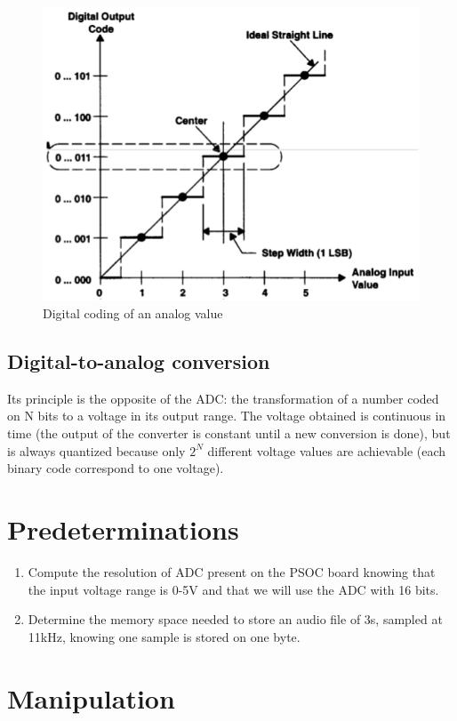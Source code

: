 \documentclass[11pt,a4paper]{article}
\theoremstyle{definition}%
\begin{document}
\begin{figure}
	\centering
	\includegraphics[width=.7\textwidth]{an-dig}
	\caption{Digital coding of an analog value}
	\label{fig:an-dig}
\end{figure}

\subsection{Digital-to-analog conversion}
Its principle is the opposite of the ADC: the transformation of a number coded on N bits to a voltage in its output range.
The voltage obtained is continuous in time (the output of the converter is constant until a new conversion is done), but is always quantized because only $2^N$ different voltage values are achievable (each binary code correspond to one voltage).



\section{Predeterminations}\label{sec:predet}
\begin{enumerate}
	\item Compute the resolution of ADC present on the PSOC board knowing that the input voltage range is 0-5V and that we will use the ADC with 16 bits.
	\item Determine the memory space needed to store an audio file of 3s, sampled at 11kHz, knowing one sample is stored on one byte.
\end{enumerate}



\section{Manipulation}
\end{document}
